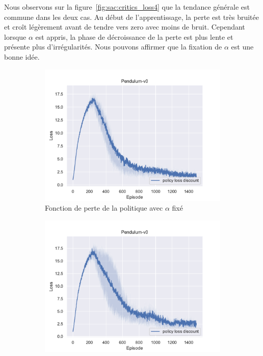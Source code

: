 Nous observons sur la figure~\ref{fig:sac:critics_loss4} que la tendance générale est commune dans les deux cas. Au début
de l'apprentissage, la perte est très bruitée et croît légèrement avant de
tendre vers zero avec moins de bruit. Cependant lorsque \(\alpha\) est appris,
la phase de décroissance de la perte est plus lente et présente plus
d'irrégularités. Nous pouvons affirmer que la fixation de \(\alpha\) est une
bonne idée.

\begin{figure}[H]
    \centering
    \begin{subfigure}{0.45\textwidth}
        \includegraphics[width=\textwidth]{figures/sac_itr4/a_fixed/policy_loss_Pendulum-v0_pg_dataset_td_trajs_1500_update_threshold_1000_nb_updates_20_gamma_0.98_tau_0.01_nstep_5_lr_act_0.0005_lr_critic_0.001_init_alpha_0.02_lr_alpha_0.0_target_entropy_alpha_-1.0pg.pdf}
        \caption{Fonction de perte de la politique avec \(\alpha\) fixé}
    \end{subfigure}
    \begin{subfigure}{0.45\textwidth}
        \includegraphics[width=\textwidth]{figures/sac_itr4/a_learned/policy_loss_Pendulum-v0_pg_dataset_td_trajs_1500_update_threshold_1000_nb_updates_20_gamma_0.98_tau_0.01_nstep_5_lr_act_0.0005_lr_critic_0.001_init_alpha_0.02_lr_alpha_0.001_target_entropy_alpha_-1.0pg.pdf}

\end{subfigure}
\end{figure}
